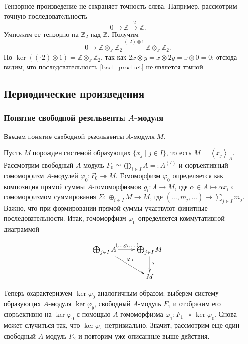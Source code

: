    Тензорное произведение не сохраняет точность слева. Например, рассмотрим точную последовательность
    \begin{equation*}
        0 \rightarrow \mathbb{Z} \xrightarrow{\cdot 2} \mathbb{Z}.
    \end{equation*}
    Умножим ее тензорно на $\mathbb{Z}_2$ над $\mathbb{Z}$. Получим
    \begin{equation} \label{bad_product}
        0 \rightarrow \mathbb{Z} \otimes_\mathbb{Z} \mathbb{Z}_2 \xrightarrow{(\cdot 2) \otimes 1} \mathbb{Z} \otimes_\mathbb{Z} \mathbb{Z}_2.
    \end{equation}
    Но $\ker((\cdot 2) \otimes 1) = \mathbb{Z} \otimes_\mathbb{Z} \mathbb{Z}_2$, так как $2x \otimes y = x \otimes 2y = x \otimes 0 = 0$; отсюда видим, 
    что последовательность \eqref{bad_product} не является точной.

    \subsection{Периодические произведения}

    \subsubsection{Понятие свободной резольвенты $A$-модуля}
    Введем понятие свободной резольвенты $A$-модуля $M$. 
    
    Пусть $M$ порожден системой образующих $\{x_j \mid j \in I\}$, то есть $M = \left<x_j \right>_A$.
    Рассмотрим свободный $A$-модуль $F_0 \simeq \bigoplus_{i\in I} A =: A^{(I)}$ и сюръективный гомоморфизм $A$-модулей $\varphi_0 : F_0 \twoheadrightarrow M$. Гомоморфизм
    $\varphi_0$ определяется как композиция прямой суммы $A$-гомоморфизмов $g_i : A \rightarrow M$, где $\alpha \in A \mapsto \alpha x_i$ с гомоморфизмом суммирования
    $\Sigma : \oplus_{i \in I}M \rightarrow M$, где $(\dots, m_j, \dots) \mapsto \sum_{j \in I} m_j$. Важно, что при формировании прямой суммы участвуют финитные последовательности.
    Итак, гомоморфизм $\varphi_0$ определяется коммутативной диаграммой

    $$        
        \xymatrix{
            \bigoplus_{j \in I} A \ar[r]^{(\dots, g_i, \dots)} \ar[rd]^{\varphi_0}
            &\bigoplus_{j \in I} M \ar[d]^{\Sigma}\\
            &M
        }
    $$

    Теперь охарактеризуем $\ker \varphi_0$ аналогичным образом: выберем систему образующих $A$-модуля $\ker \varphi_0$, свободный $A$-модуль $F_1$ и отобразим его сюръективно на 
    $\ker \varphi_0$ с помощью $A$-гомоморфизма  $\varphi_1 : F_1 \twoheadrightarrow \ker \varphi_0$. Снова может случиться так, что $\ker \varphi_1$ нетривиально. Значит, рассмотрим еще один свободный $A$-модуль $F_2$
    и повторим уже описанные выше действия. 

